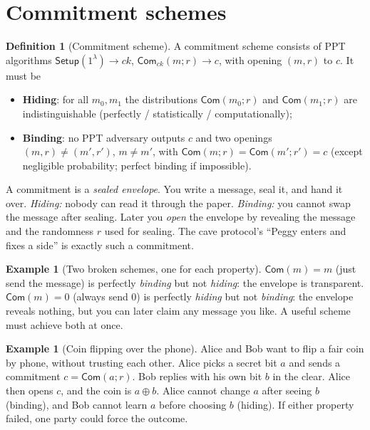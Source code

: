 \documentclass[11pt,a4paper]{report}
\theoremstyle{plain}
\theoremstyle{definition}
\newtheorem{definition}[theorem]{Definition}
\newtheorem{example}[theorem]{Example}
\theoremstyle{remark}
\newcommand{\Setup}{\mathsf{Setup}}\newcommand{\Com}{\mathsf{Com}}
\begin{document}
\section{Commitment schemes}
\begin{definition}[Commitment scheme]
A commitment scheme consists of PPT algorithms $\Setup(1^\lambda)\to ck$, $\Com_{ck}(m;r)\to c$, with opening $(m,r)$ to $c$. It must be
\begin{itemize}
\item \textbf{Hiding}: for all $m_0,m_1$ the distributions $\Com(m_0;r)$ and $\Com(m_1;r)$ are indistinguishable (perfectly / statistically / computationally);
\item \textbf{Binding}: no PPT adversary outputs $c$ and two openings $(m,r)\neq(m',r')$, $m\ne m'$, with $\Com(m;r)=\Com(m';r')=c$ (except negligible probability; perfect binding if impossible).
\end{itemize}
\end{definition}
\begin{plain}\PE
A commitment is a \emph{sealed envelope}. You write a message, seal it, and hand it over. \emph{Hiding:} nobody can read it through the paper. \emph{Binding:} you cannot swap the message after sealing. Later you \emph{open} the envelope by revealing the message and the randomness $r$ used for sealing. The cave protocol's ``Peggy enters and fixes a side'' is exactly such a commitment.
\end{plain}
\begin{example}[Two broken schemes, one for each property]
$\Com(m)=m$ (just send the message) is perfectly \emph{binding} but not \emph{hiding}: the envelope is transparent. $\Com(m)=0$ (always send $0$) is perfectly \emph{hiding} but not \emph{binding}: the envelope reveals nothing, but you can later claim any message you like. A useful scheme must achieve both at once.
\end{example}
\begin{example}[Coin flipping over the phone]
Alice and Bob want to flip a fair coin by phone, without trusting each other. Alice picks a secret bit $a$ and sends a commitment $c=\Com(a;r)$. Bob replies with his own bit $b$ in the clear. Alice then opens $c$, and the coin is $a\oplus b$. Alice cannot change $a$ after seeing $b$ (binding), and Bob cannot learn $a$ before choosing $b$ (hiding). If either property failed, one party could force the outcome.
\end{example}
\end{document}
